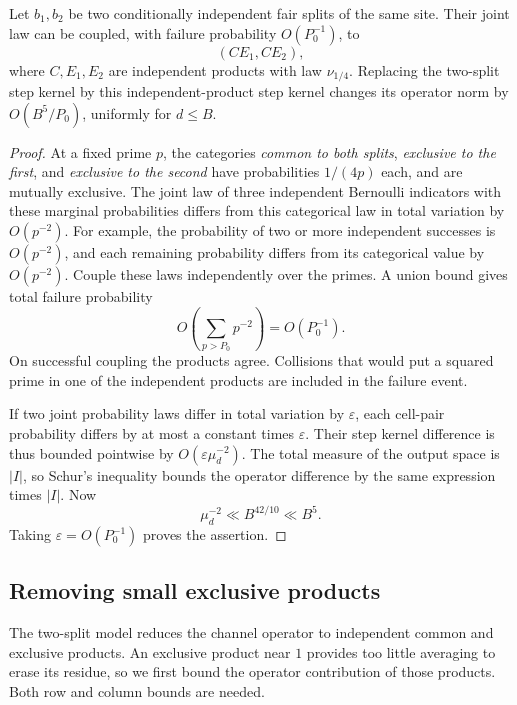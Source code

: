 \begin{lemma}
\label{lem:channels-two-splits}
Let \(b_1,b_2\) be two conditionally independent fair splits of the same
site.  Their joint law can be coupled, with failure probability
\(O(P_0^{-1})\), to
\[
 (CE_1,CE_2),
\]
where \(C,E_1,E_2\) are independent products with law \(\nu_{1/4}\).
Replacing the two-split step kernel by this independent-product step
kernel changes its operator norm by \(O(B^5/P_0)\), uniformly for \(d\le B\).
\end{lemma}

\begin{proof}
At a fixed prime \(p\), the categories \emph{common to both splits},
\emph{exclusive to the first}, and \emph{exclusive to the second} have
probabilities \(1/(4p)\) each, and are mutually exclusive.
The joint law of three independent Bernoulli indicators with these
marginal probabilities differs from this categorical law in total
variation by \(O(p^{-2})\).  For example, the probability of two or more
independent successes is \(O(p^{-2})\), and each remaining probability
differs from its categorical value by \(O(p^{-2})\).
Couple these laws independently over the primes.  A union bound gives
total failure probability
\[
 O\!\left(\sum_{p>P_0}p^{-2}\right)=O(P_0^{-1}).
\]
On successful coupling the products agree.  Collisions that would put
a squared prime in one of the independent products are included in the
failure event.

If two joint probability laws differ in total variation by \(\varepsilon\),
each cell-pair probability differs by at most a constant times
\(\varepsilon\).  Their step kernel difference is thus bounded pointwise
by \(O(\varepsilon\mu_d^{-2})\).
The total measure of the output space is \(|I|\), so Schur's inequality
bounds the operator difference by the same expression times \(|I|\).
Now
\[
 \mu_d^{-2}\ll B^{42/10}\ll B^5.
\]
Taking \(\varepsilon=O(P_0^{-1})\) proves the assertion.
\end{proof}

\subsection{Removing small exclusive products}

The two-split model reduces the channel operator to independent common
and exclusive products. An exclusive product near $1$ provides too little
averaging to erase its residue, so we first bound the operator contribution
of those products. Both row and column bounds are needed.

